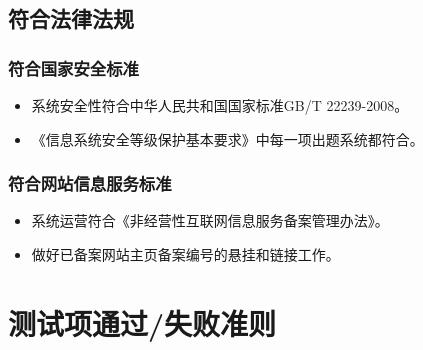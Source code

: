 \documentclass[hyperref, a4paper]{ctexart}
\providecommand{\tightlist}{%
  \setlength{\itemsep}{0pt}\setlength{\parskip}{0pt}}
\begin{document}
\hypertarget{ux7b26ux5408ux6cd5ux5f8bux6cd5ux89c4}{%
\subsection{符合法律法规}\label{ux7b26ux5408ux6cd5ux5f8bux6cd5ux89c4}}

\hypertarget{ux7b26ux5408ux56fdux5bb6ux5b89ux5168ux6807ux51c6}{%
\subsubsection{符合国家安全标准}\label{ux7b26ux5408ux56fdux5bb6ux5b89ux5168ux6807ux51c6}}

\begin{itemize}
\tightlist
\item
  系统安全性符合中华人民共和国国家标准GB/T 22239-2008。
\item
  《信息系统安全等级保护基本要求》中每一项出题系统都符合。
\end{itemize}

\hypertarget{ux7b26ux5408ux7f51ux7ad9ux4fe1ux606fux670dux52a1ux6807ux51c6}{%
\subsubsection{符合网站信息服务标准}\label{ux7b26ux5408ux7f51ux7ad9ux4fe1ux606fux670dux52a1ux6807ux51c6}}

\begin{itemize}
\tightlist
\item
  系统运营符合《非经营性互联网信息服务备案管理办法》。
\item
  做好已备案网站主页备案编号的悬挂和链接工作。
\end{itemize}

\hypertarget{ux6d4bux8bd5ux9879ux901aux8fc7ux5931ux8d25ux51c6ux5219}{%
\section{测试项通过/失败准则}\label{ux6d4bux8bd5ux9879ux901aux8fc7ux5931ux8d25ux51c6ux5219}}
\end{document}
